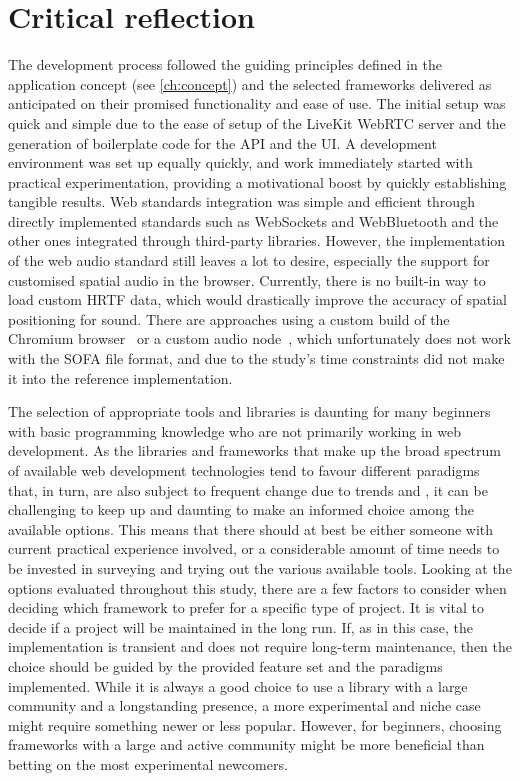\section{Critical reflection}
\label{sec:critical-evaluation}

The development process followed the guiding principles defined in the application concept (see \autoref{ch:concept}) and the selected frameworks delivered as anticipated on their promised functionality and ease of use.
The initial setup was quick and simple due to the ease of setup of the LiveKit \ac{WebRTC} server and the generation of boilerplate code for the \ac{API} and the \ac{UI}.
A development environment was set up equally quickly, and work immediately started with practical experimentation, providing a motivational boost by quickly establishing tangible results.
Web standards integration was simple and efficient through directly implemented standards such as WebSockets and WebBluetooth and the other ones integrated through third-party libraries.
However, the implementation of the web audio standard still leaves a lot to desire, especially the support for customised spatial audio in the browser.
Currently, there is no built-in way to load custom \ac{HRTF} data, which would drastically improve the accuracy of spatial positioning for sound.
There are approaches using a custom build of the Chromium browser~\parencite{chromiumCustomHrtf} or a custom audio node~\parencite{customHrtfAudioNode}, which unfortunately does not work with the \ac{SOFA} file format, and due to the study's time constraints did not make it into the reference implementation.

The selection of appropriate tools and libraries is daunting for many beginners with basic programming knowledge who are not primarily working in web development.
As the libraries and frameworks that make up the broad spectrum of available web development technologies tend to favour different paradigms that, in turn, are also subject to frequent change due to trends and , it can be challenging to keep up and daunting to make an informed choice among the available options.
This means that there should at best be either someone with current practical experience involved, or a considerable amount of time needs to be invested in surveying and trying out the various available tools.
Looking at the options evaluated throughout this study, there are a few factors to consider when deciding which framework to prefer for a specific type of project.
It is vital to decide if a project will be maintained in the long run.
If, as in this case, the implementation is transient and does not require long-term maintenance, then the choice should be guided by the provided feature set and the paradigms implemented.
While it is always a good choice to use a library with a large community and a longstanding presence, a more experimental and niche case might require something newer or less popular.
However, for beginners, choosing frameworks with a large and active community might be more beneficial than betting on the most experimental newcomers.

